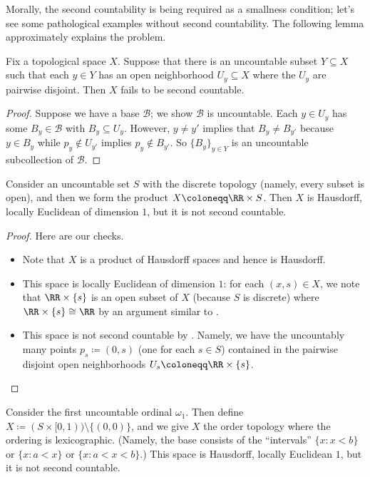 \documentclass[../notes.tex]{subfiles}
\begin{document}
Morally, the second countability is being required as a smallness condition; let's see some pathological examples without second countability. The following lemma approximately explains the problem.
\begin{lemma} \label{lem:not-second-countable}
	Fix a topological space $X$. Suppose that there is an uncountable subset $Y\subseteq X$ such that each $y\in Y$ has an open neighborhood $U_y\subseteq X$ where the $U_y$ are pairwise disjoint. Then $X$ fails to be second countable.
\end{lemma}
\begin{proof}
	Suppose we have a base $\mathcal B$; we show $\mathcal B$ is uncountable. Each $y\in U_y$ has some $B_y\in\mathcal B$ with $B_y\subseteq U_y$. However, $y\ne y'$ implies that $B_y\ne B_{y'}$ because $y\in B_y$ while $p_y\notin U_{y'}$ implies $p_y\notin B_{y'}$. So $\{B_y\}_{y\in Y}$ is an uncountable subcollection of $\mathcal B$.
\end{proof}
\begin{exe}
	Consider an uncountable set $S$ with the discrete topology (namely, every subset is open), and then we form the product $X\coloneqq\RR\times S$. Then $X$ is Hausdorff, locally Euclidean of dimension $1$, but it is not second countable.
\end{exe}
\begin{proof}
	Here are our checks.
	\begin{itemize}
		\item Note that $X$ is a product of Hausdorff spaces and hence is Hausdorff.
		\item This space is locally Euclidean of dimension $1$: for each $(x,s)\in X$, we note that $\RR\times\{s\}$ is an open subset of $X$ (because $S$ is discrete) where $\RR\times\{s\}\cong\RR$ by an argument similar to .
		\item This space is not second countable by . Namely, we have the uncountably many points $p_s\coloneqq(0,s)$ (one for each $s\in S$) contained in the pairwise disjoint open neighborhoods $U_s\coloneqq\RR\times\{s\}$.
		\qedhere
	\end{itemize}
\end{proof}
\begin{exe}
	Consider the first uncountable ordinal $\omega_1$. Then define $X\coloneqq(S\times[0,1))\setminus\{(0,0)\}$, and we give $X$ the order topology where the ordering is lexicographic. (Namely, the base consists of the ``intervals'' $\{x:x<b\}$ or $\{x:a<x\}$ or $\{x:a<x<b\}$.) This space is Hausdorff, locally Euclidean $1$, but it is not second countable.
\end{exe}
\end{document}
